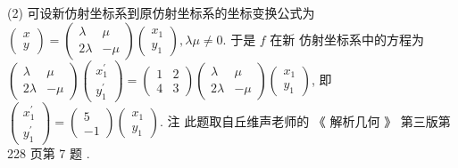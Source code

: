 \documentclass[10pt]{article}
\begin{document}
(2)  可设新仿射坐标系到原仿射坐标系的坐标变换公式为  $\left(\begin{array}{l}x \\ y\end{array}\right)=\left(\begin{array}{cc}\lambda & \mu \\ 2 \lambda & -\mu\end{array}\right)\left(\begin{array}{l}x_{1} \\ y_{1}\end{array}\right), \lambda \mu \neq 0$.  于是  $f$  在新   仿射坐标系中的方程为  $\left(\begin{array}{cc}\lambda & \mu \\ 2 \lambda & -\mu\end{array}\right)\left(\begin{array}{l}x_{1}^{\prime} \\ y_{1}^{\prime}\end{array}\right)=\left(\begin{array}{cc}1 & 2 \\ 4 & 3\end{array}\right)\left(\begin{array}{cc}\lambda & \mu \\ 2 \lambda & -\mu\end{array}\right)\left(\begin{array}{l}x_{1} \\ y_{1}\end{array}\right)$,  即  $\left(\begin{array}{l}x_{1}^{\prime} \\ y_{1}^{\prime}\end{array}\right)=\left(\begin{array}{c}5 \\ -1\end{array}\right)\left(\begin{array}{l}x_{1} \\ y_{1}\end{array}\right)$.  注   此题取自丘维声老师的 《 解析几何 》 第三版第  228  页第  7  题 .
\end{document}
